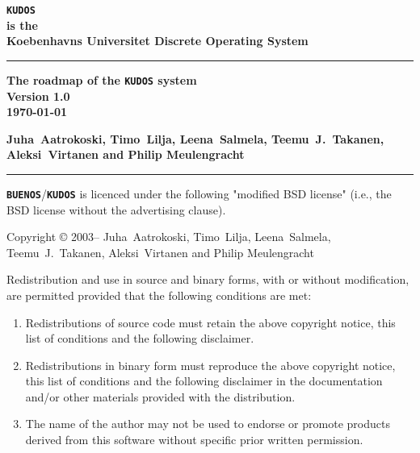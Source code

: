 \documentclass[twoside,a4paper]{report}
\newcommand{\buenos}{\texttt{\textbf{BUENOS}}}
\newcommand{\kudos}{\texttt{\textbf{KUDOS}}}
\newcommand{\authors}{%
Juha~Aatrokoski, Timo~Lilja, Leena~Salmela, %
Teemu~J.~Takanen, Aleksi~Virtanen and Philip Meulengracht%
}
\begin{document}
\pagestyle{plain}
\begin{titlepage}
{
\raggedright\bfseries\Huge
\texttt{KUDOS}\\
\large
\hspace{1em}is the\\
Koebenhavns Universitet Discrete Operating System\\
\rule{\textwidth}{2mm}
\raggedleft\bfseries\large
The roadmap of the \texttt{KUDOS} system\\
Version 1.0\\
\today\\
\raggedright\bfseries\large
\authors{}\\
\rule{\textwidth}{1mm}
}
\newpage
{}
\noindent

\noindent\buenos{}/\kudos{} is licenced under the following "modified BSD
license" (i.e., the BSD license without the advertising clause).

\begin{flushleft}
\vspace{\baselineskip}
Copyright \copyright{} 2003--\number\year{} \authors{}
\vspace{\baselineskip}
\end{flushleft}

Redistribution and use in source and binary forms, with or without
modification, are permitted provided that the following conditions
are met:

\begin{enumerate}
\item Redistributions of source code must retain the above copyright
    notice, this list of conditions and the following disclaimer.
\item Redistributions in binary form must reproduce the above
    copyright notice, this list of conditions and the following
    disclaimer in the documentation and/or other materials provided
    with the distribution.
\item The name of the author may not be used to endorse or promote
    products derived from this software without specific prior
    written permission.
\end{enumerate}


\end{titlepage}
\end{document}
